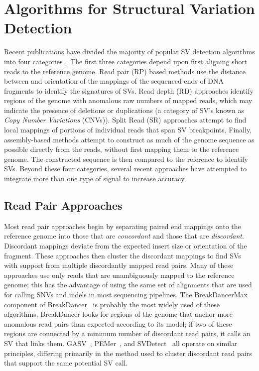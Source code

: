 \chapter{Algorithms for Structural Variation Detection}\label{chap_related_work}

Recent publications have divided the majority of popular SV detection algorithms into four categories~\cite{Alkan:2011p547}. The first three categories depend upon first aligning short reads to the reference genome. Read pair (RP) based methods use the distance between and orientation of the mappings of the sequenced ends of DNA fragments to identify the signatures of SVs. Read depth (RD) approaches identify regions of the genome with anomalous raw numbers of mapped reads, which may indicate the presence of deletions or duplications (a category of SV's known as \emph{Copy Number Variations} (CNVs)). Split Read (SR) approaches attempt to find local mappings of portions of individual reads that span SV breakpoints. Finally, assembly-based methods attempt to construct as much of the genome sequence as possible directly from the reads, without first mapping them to the reference genome. The constructed sequence is then compared to the reference to identify SVs. Beyond these four categories, several recent approaches have attempted to integrate more than one type of signal to increase accuracy. 

\section{Read Pair Approaches}\label{section_read_pair}

Most read pair approaches begin by separating paired end mappings onto the reference genome into those that are \emph{concordant} and those that are \emph{discordant}. Discordant mappings deviate from the expected insert size or orientation of the fragment. These approaches then cluster the discordant mappings to find SVs with support from multiple discordantly mapped read pairs. Many of these approaches use only reads that are unambiguously mapped to the reference genome; this has the advantage of using the same set of alignments that are used for calling SNVs and indels in most sequencing pipelines. The BreakDancerMax component of BreakDancer~\cite{Chen:2009p3} is probably the most widely used of these algorithms. BreakDancer looks for regions of the genome that anchor more anomalous read pairs than expected according to its model; if two of these regions are connected by a minimum number of discordant read pairs, it calls an SV that links them. GASV~\cite{Sindi:2009gu}, PEMer~\cite{Korbel:2009dy}, and SVDetect~\cite{Zeitouni:2010p8} all operate on similar principles, differing primarily in the method used to cluster discordant read pairs that support the same potential SV call.

